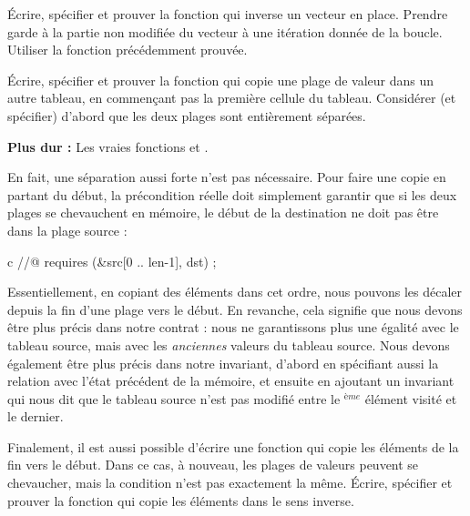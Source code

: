 





Écrire, spécifier et prouver la fonction qui inverse un vecteur en place.
Prendre garde à la partie non modifiée du vecteur à une itération donnée de la
boucle. Utiliser la fonction  précédemment prouvée.








Écrire, spécifier et prouver la fonction  qui copie une plage
de valeur dans un autre tableau, en commençant pas la première cellule du
tableau. Considérer (et spécifier) d'abord que les deux plages sont entièrement
séparées.




\textbf{Plus dur :} Les vraies fonctions  et
.


En fait, une séparation aussi forte n'est pas nécessaire. Pour faire une copie
en partant du début, la précondition réelle doit simplement garantir que si les
deux plages se chevauchent en mémoire, le début de la destination ne doit pas être
dans la plage source :


\begin{CodeBlock}{c}
//@ requires \separated(&src[0 .. len-1], dst) ;
\end{CodeBlock}


Essentiellement, en copiant des éléments dans cet ordre, nous pouvons les
décaler depuis la fin d'une plage vers le début. En revanche, cela signifie que
nous devons être plus précis dans notre contrat : nous ne garantissons plus une
égalité avec le tableau source, mais avec les \textit{anciennes} valeurs du tableau
source. Nous devons également être plus précis dans notre invariant, d'abord en
spécifiant aussi la relation avec l'état précédent de la mémoire, et ensuite en
ajoutant un invariant qui nous dit que le tableau source n'est pas modifié entre
le $^{ème}$ élément visité et le dernier.


Finalement, il est aussi possible d'écrire une fonction qui copie les éléments de
la fin vers le début. Dans ce cas, à nouveau, les plages de valeurs peuvent se
chevaucher, mais la condition n'est pas exactement la même. Écrire, spécifier et
prouver la fonction  qui copie les éléments dans le
sens inverse.


